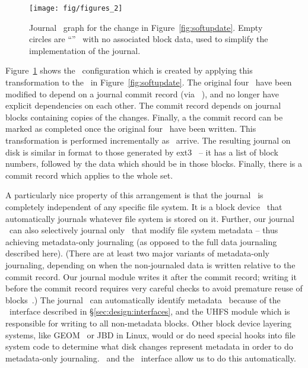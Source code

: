\begin{figure}
  \centering
  \texttt{[image: fig/figures\_2]}
  \caption{\label{fig:journal} Journal \chdesc\ graph for the
    change in Figure~\ref{fig:softupdate}. Empty circles are
    ``\noop'' \chdescs\ with no associated block data, used
    to simplify the implementation of the journal.}
\end{figure}

Figure~\ref{fig:journal} shows the \chdesc\ configuration which is created by
applying this transformation to the \chdescs\ in Figure~\ref{fig:softupdate}.
The original four \chdescs\ have been modified to depend on a journal commit
record (via \anoop\ \chdesc), and no longer have explicit dependencies on each
other. The commit record depends on journal blocks containing copies of the
changes. Finally, a the commit record can be marked as completed once the
original four \chdescs\ have been written. This transformation is performed
incrementally as \chdescs\ arrive. The resulting journal on disk is similar in
format to those generated by ext3~\cite{tweedie98journaling} -- it has a list of
block numbers, followed by the data which should be in those blocks. Finally,
there is a commit record which applies to the whole set.

A particularly nice property of this arrangement is that the journal \module\ is
completely independent of any specific file system. It is a block device
\module\ that automatically journals whatever file system is stored on it.
Further, our journal \module\ can also selectively journal only \chdescs\ that
modify file system metadata -- thus achieving metadata-only journaling (as
opposed to the full data journaling described here). (There are at least two
major variants of metadata-only journaling, depending on when the non-journaled
data is written relative to the commit record. Our journal module writes it
after the commit record; writing it before the commit record requires very
careful checks to avoid premature reuse of blocks~\cite{tweedie00ext3}.) The
journal \module\ can automatically identify metadata \chdescs\ because of the
\LFS\ interface described in \S\ref{sec:design:interfaces}, and the UHFS module
which is responsible for writing to all non-metadata blocks. Other block device
layering systems, like GEOM~\cite{geom} or JBD in Linux, would or do need
special hooks into file system code to determine what disk changes represent
metadata in order to do metadata-only journaling. \Chdescs\ and the \LFS\
interface allow us to do this automatically.
